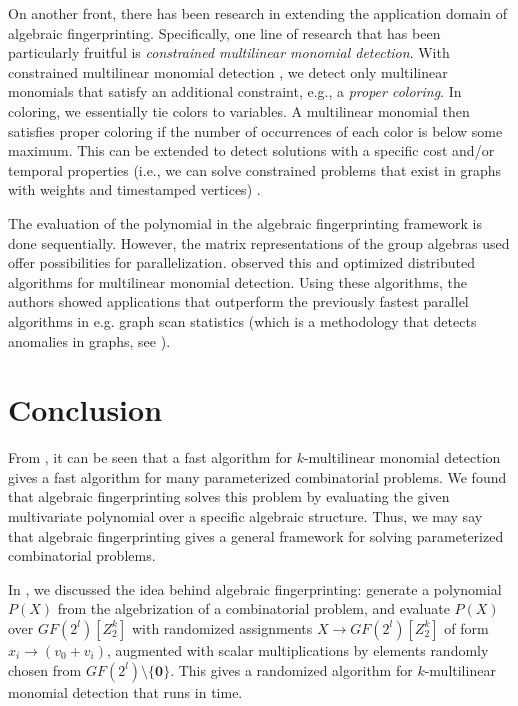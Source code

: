 On another front, there has been research in 
extending the application domain of algebraic fingerprinting. 
Specifically, one line of research that has been particularly fruitful 
is \emph{constrained multilinear monomial detection}. 
With constrained multilinear monomial detection \cite{Koutis12, Björklund16}, 
we detect only multilinear monomials that satisfy an additional constraint, 
e.g., a \emph{proper coloring}. 
In coloring, we essentially tie colors to variables. 
A multilinear monomial then satisfies proper coloring 
if the number of occurrences of each color is below some maximum. 
This can be extended to detect solutions with a specific cost \cite{Björklund16} 
and/or temporal properties 
(i.e., we can solve constrained problems that exist in graphs with weights and timestamped vertices) 
\cite{Thejaswi20}.

The evaluation of the polynomial in the algebraic fingerprinting framework is done sequentially. 
However, the matrix representations of the group algebras used 
offer possibilities for parallelization. \textcite{Midas19} observed this and 
optimized distributed algorithms for multilinear monomial detection. 
Using these algorithms, the authors showed applications that outperform the previously 
fastest parallel algorithms in e.g. graph scan statistics (which 
is a methodology that detects anomalies in graphs, see ).

\section{Conclusion}
\label{sect:conclusion}

From , 
it can be seen  
that a fast algorithm for $k$-multilinear monomial detection gives a 
fast algorithm for many parameterized combinatorial problems. 
We found that algebraic fingerprinting solves this problem by 
evaluating the given multivariate polynomial over a specific algebraic structure. 
Thus, we 
may say that algebraic fingerprinting gives a general framework for solving 
parameterized combinatorial problems. 

In , we discussed the idea behind 
algebraic fingerprinting: generate a polynomial $P(X)$ from the algebrization of 
a combinatorial problem, and evaluate $P(X)$ over $GF(2^{l})[Z_2^k]$ with 
randomized assignments $X \to GF(2^{l})[Z_2^k]$ of form 
$x_i \to (v_0 + v_i)$, augmented with scalar multiplications 
by elements randomly chosen from $GF(2^{l}) \setminus \{\mathbf{0}\}$. 
This gives a randomized algorithm for 
$k$-multilinear monomial detection that runs in  time.

